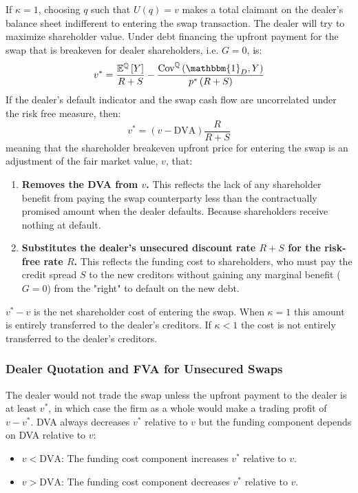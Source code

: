 \documentclass[10pt,a4paper]{article}
\begin{document}
                If $\kappa=1$, choosing $q$ such that $U(q)=v$ makes a total claimant on the dealer's balance sheet indifferent to entering the swap transaction. The dealer will try to maximize shareholder value. Under debt financing the upfront payment for the swap that is breakeven for dealer shareholders, i.e. $G=0$, is:
                    \begin{equation}
                        v^{\ast} = \frac{\mathbb{E}^{\mathbb{Q}}\left[Y\right]}{R+S} - \frac{\text{Cov}^{\mathbb{Q}}\left(\mathbbm{1}_{D}, Y\right)}{p^{\ast}\left(R+S\right) }
                    \end{equation}
                If the dealer's default indicator and the swap cash flow are uncorrelated under the risk free measure, then:
                    \begin{equation}
                        v^{\ast} = (v - \text{DVA})\frac{R}{R+S} 
                    \end{equation}
                meaning that the shareholder breakeven upfront price for entering the swap is an adjustment of the fair market value, $v$, that:
                    \begin{enumerate}
                        \item \textbf{Removes the DVA from $v$.} This reflects the lack of any shareholder benefit from paying the swap counterparty less than the contractually promised amount when the dealer defaults. Because shareholders receive nothing at default.
                        \item \textbf{Substitutes the dealer's unsecured discount rate $R+S$ for the risk-free rate $R$.} This reflects the funding cost to shareholders, who must pay the credit spread $S$ to the new creditors without gaining any marginal benefit ($G=0$) from the "right" to default on the new debt.
                    \end{enumerate}
                $v^{\ast} - v$ is the net shareholder cost of entering the swap. When $\kappa=1$ this amount is entirely transferred to the dealer's creditors. If $\kappa<1$ the cost is not entirely transferred to the dealer's creditors. 

            \subsubsection{Dealer Quotation and FVA for Unsecured Swaps}
                The dealer would not trade the swap unless the upfront payment to the dealer is at least $v^{\ast}$, in which case the firm as a whole would make a trading profit of $v-v^{\ast}$. DVA always decreases $v^{\ast}$ relative to $v$ but the funding component depends on DVA relative to $v$:
                    \begin{itemize}
                        \item $v < \text{DVA}$: The funding cost component increases $v^{\ast}$ relative to $v$. 
                        \item $v > \text{DVA}$: The funding cost component decreases $v^{\ast}$ relative to $v$.
                    \end{itemize}
\end{document}
